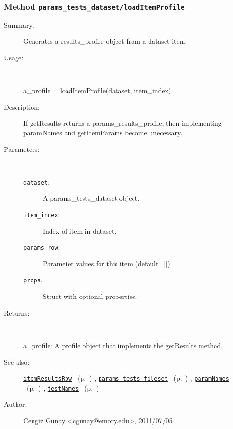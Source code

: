 \subsubsection[Method \texttt{loadItemProfile}]{Method \texttt{params\_tests\_dataset/loadItemProfile}}%
%
\label{ref_params_tests_dataset__loadItemProfile}%
\hypertarget{ref_params_tests_dataset__loadItemProfile}{}%
\begin{description}
\item[Summary:]Generates a results\_profile object from a dataset item.
%
\item[Usage:]~%
\begin{lyxcode}%
a\_profile = loadItemProfile(dataset, item\_index)
%
\end{lyxcode}%
%
\item[Description:]%
If getResults returns a params\_results\_profile, then implementing
 paramNames and getItemParams become unecessary.
\item[Parameters:]~
\begin{description}%
\item[\texttt{dataset}:]
 A params\_tests\_dataset object.
\item[\texttt{item\_index}:]
 Index of item in dataset.
\item[\texttt{params\_row}:]
 Parameter values for this item (default=[])
\item[\texttt{props}:]
 Struct with optional properties.
\end{description}%
%
\item[Returns:
]~

   a\_profile: A profile object that implements the getResults method.
%
%
\item[See also:]%
\hyperlink{ref_itemResultsRow}{\texttt{itemResultsRow}}%
\ (p.~\pageref{ref_itemResultsRow})%
%
, \hyperlink{ref_params_tests_fileset}{\texttt{params\_tests\_fileset}}%
\ (p.~\pageref{ref_params_tests_fileset})%
%
, \hyperlink{ref_paramNames}{\texttt{paramNames}}%
\ (p.~\pageref{ref_paramNames})%
%
, \hyperlink{ref_testNames}{\texttt{testNames}}%
\ (p.~\pageref{ref_testNames})%
%
%
\item[Author:]%
Cengiz Gunay <cgunay@emory.edu>, 2011/07/05
%
\end{description}
\methodline%
